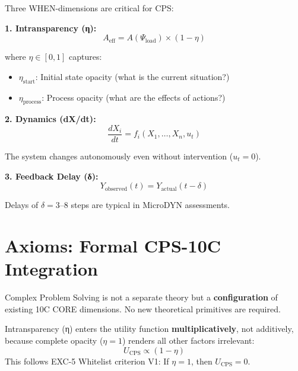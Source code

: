 Three WHEN-dimensions are critical for CPS:

\textbf{1. Intransparency (η):}
\begin{equation}
A_{\text{eff}} = A(\Psi_{\text{load}}) \times (1 - \eta)
\end{equation}

where $\eta \in [0,1]$ captures:
\begin{itemize}
\item $\eta_{\text{start}}$: Initial state opacity (what is the current situation?)
\item $\eta_{\text{process}}$: Process opacity (what are the effects of actions?)
\end{itemize}

\textbf{2. Dynamics (dX/dt):}
\begin{equation}
\frac{dX_i}{dt} = f_i(X_1, \ldots, X_n, u_t)
\end{equation}

The system changes autonomously even without intervention ($u_t = 0$).

\textbf{3. Feedback Delay (δ):}
\begin{equation}
Y_{\text{observed}}(t) = Y_{\text{actual}}(t - \delta)
\end{equation}

Delays of $\delta = 3$--$8$ steps are typical in MicroDYN assessments.



\section{Axioms: Formal CPS-10C Integration}
\label{sec:cps-axioms}

\begin{tcolorbox}[colback=red!5!white, colframe=red!75!black,
    title=Axiom CPS-1: Configuration Principle]
Complex Problem Solving is not a separate theory but a \textbf{configuration} of existing 10C CORE dimensions. No new theoretical primitives are required.
\end{tcolorbox}

\begin{tcolorbox}[colback=red!5!white, colframe=red!75!black,
    title=Axiom CPS-2: Multiplicative Transparency]
Intransparency (η) enters the utility function \textbf{multiplicatively}, not additively, because complete opacity ($\eta = 1$) renders all other factors irrelevant:
\begin{equation}
U_{\text{CPS}} \propto (1 - \eta)
\end{equation}
This follows EXC-5 Whitelist criterion V1: If $\eta = 1$, then $U_{\text{CPS}} = 0$.
\end{tcolorbox}

